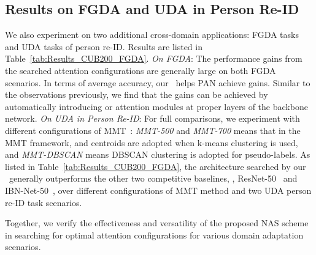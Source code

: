 \documentclass[10pt,twocolumn,letterpaper]{article}
\begin{document}
\subsection{Results on FGDA and UDA in Person Re-ID}
We also experiment on two additional cross-domain applications: FGDA tasks and UDA tasks of person re-ID.
Results are listed in Table~\ref{tab:Results_CUB200_FGDA}.
\textit{On FGDA}:
The performance gains from the searched attention configurations are generally large on both FGDA scenarios. In terms of average accuracy, our \iMethod\, helps PAN achieve  gains. Similar to the observations previously, we find that the gains can be achieved by automatically introducing  or  attention modules at proper layers of the backbone network. \textit{On UDA in Person Re-ID}:
For full comparisons, we experiment with different configurations of MMT~\cite{ge2020MMT}: \textit{MMT-500} and \textit{MMT-700} means that in the MMT framework,  and  centroids are adopted when k-means clustering is used, and \textit{MMT-DBSCAN} means DBSCAN clustering is adopted for pseudo-labels.
As listed in Table~\ref{tab:Results_CUB200_FGDA}, the architecture searched by our \iMethod\  generally outperforms the other two competitive baselines, \ie, ResNet-50~\cite{he2016resnet} and IBN-Net-50~\cite{pan2018IBNNet}, over different configurations of MMT method and two UDA person re-ID task scenarios.


Together, we verify the effectiveness and versatility of the proposed NAS scheme in searching for optimal attention configurations for various domain adaptation scenarios.
\end{document}
